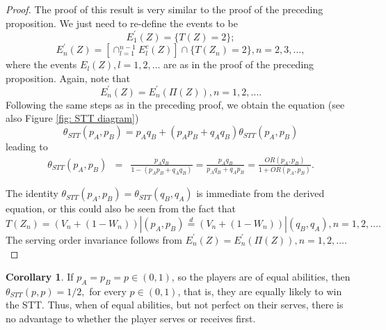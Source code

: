 \documentclass[11pt]{article}
\theoremstyle{plain}
\theoremstyle{definition}
\newtheorem{corollary}{Corollary}[theorem]
\newcommand{\OLDPROOF}[1]{}
\begin{document}
\begin{proof}
    The proof of this result is very similar to the proof of the preceding proposition. We just need to re-define the events to be
    $$E_1^\prime(Z) =  \{T(Z) = 2\};$$
    $$E_n^\prime(Z) = \left[\cap_{l=1}^{n-1} E_l^c(Z)\right] \cap \{T(Z_n) = 2\}, n=2,3,\ldots,$$
    where the events $E_l(Z), l=1,2,\ldots$ are as in the proof of the preceding proposition. Again, note that
    $$E_n^\prime(Z) = E_n^\prime(\Pi(Z)), n=1,2,\ldots.$$
    Following the same steps as in the preceding proof, we obtain the equation (see also Figure \ref{fig: STT diagram})
    $$\theta_{STT}(p_A,p_B) = p_Aq_B + (p_Ap_B + q_Aq_B) \theta_{STT}(p_A,p_B)$$
    leading to
    \begin{eqnarray*}
    \theta_{STT}(p_A,p_B) & = & \frac{p_Aq_B}{1 - (p_Ap_B + q_Aq_B)} 
     =  \frac{p_Aq_B}{p_Aq_B + q_Ap_B} 
     =  \frac{OR(p_A,p_B)}{1+OR(p_A,p_B)}.
    \end{eqnarray*}
    
    
\OLDPROOF{It amounts to dropping the terms associated with player $B$ winning the tie-breaker's tie-breaker (see Figure \ref{fig: STT diagram} where the $B$ is enclosed by a square), so dropping the terms $q_Ap_B$, $p_Ap_Bp_Bq_A$, and $q_Aq_Bp_Bq_A$. Doing so, then computing $\theta_{STT}(p_A,p_B)$, we obtain
    \begin{eqnarray*}
    \theta_{STT}(p_A,p_B) & = & \frac{(p_Aq_B)(1 + p_Ap_B + q_Aq_B)}{1 - (p_Ap_B +q_Aq_B)(q_Bq_A + p_Bp_A)} \\
& = & \frac{(p_Aq_B)(1 + p_Ap_B + q_Aq_B)}{[1 - (p_Ap_B +q_Aq_B)][1 + (p_Ap_B +q_Aq_B)]} \\
& = & \frac{p_Aq_B}{p_Aq_B + q_Ap_B} 
 =  \frac{OR(p_A,p_B)}{1 + OR(p_A,p_B)}.
\end{eqnarray*}
%
}
The identity $\theta_{STT}(p_A,p_B) = \theta_{STT}(q_B,q_A)$ is immediate from the derived equation, or this could also be seen from the fact that $$T(Z_n) = (V_n + (1-W_n))|(p_A,p_B) \stackrel{d}{=} (V_n + (1-W_n))|(q_B,q_A), n=1,2,\ldots.$$ The serving order invariance follows from $E_n^\prime(Z) = E_n^\prime(\Pi(Z)), n=1,2,\ldots.$
\end{proof}

\begin{corollary}
If $p_A = p_B = p \in (0,1)$, so the players are of equal abilities, then $\theta_{STT}(p,p) = 1/2,$ for every $p \in (0,1)$, that is, they are equally likely to win the STT. Thus, when of equal abilities, but not perfect on their serves, there is no advantage to whether the player serves or receives first.
\end{corollary}
\end{document}
